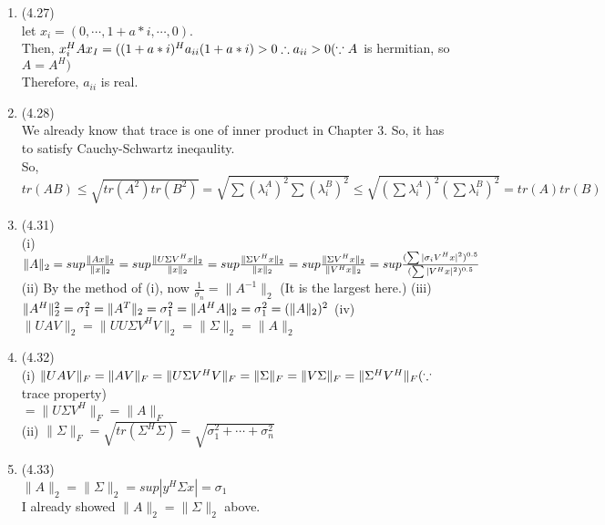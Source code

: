 \documentclass[letterpaper,12pt]{article}
\theoremstyle{definition}
\begin{document}
\begin{enumerate}
	\item (4.27) \\
let $x_i=(0, \cdots, 1+a*i, \cdots, 0)$.\\
Then, $x_i^HAx_I=((1+a*i)^Ha_{ii}(1+a*i)>0\\
\therefore a_{ii}>0 \\
(\because A$ is hermitian, so $A=A^H)$\\
Therefore, $a_{ii}$ is real.



 	\item (4.28) \\
We already know that trace is one of inner product in Chapter 3. So, it has to satisfy Cauchy-Schwartz ineqaulity.\\
So, $ tr(AB) \leq \sqrt{tr(A^2)tr(B^2)} = \sqrt{\sum (\lambda_i^A)^2\sum (\lambda_i^B)^2} \leq \sqrt{(\sum \lambda_i^A)^2(\sum \lambda_i^B)^2} = tr(A)tr(B)
$



 	\item (4.31) \\
(i) $\|A\|_2 = sup\frac{\| Ax\|_2}{\| x\|_2} =sup\frac{\| U\Sigma V^Hx\|_2}{\| x\|_2} =sup\frac{\| \Sigma V^Hx\|_2}{\| x\|_2} =sup\frac{\| \Sigma V^Hx\|_2}{\| V^Hx\|_2} = sup\frac{(\sum|\sigma_i V^Hx|^2 )^{0.5}}{(\sum|V^Hx|^2 )^{0.5}} \\$
(ii) By the method of (i), now $\frac{1}{\sigma_n}=\|A^{-1}\|_2 $ (It is the largest here.)$
$
(iii) $\| A^H\|_2^2=\sigma_1^2=\| A^T\|_2 = \sigma_1^2 = \| A^HA\|_2 = \sigma_1^2 = (\| A\|_2)^2\\$
(iv) $\| UAV\|_2 = \| UU\Sigma V^HV\|_2 = \| \Sigma\|_2 = \| A\|_2$





 	\item (4.32) \\
(i) $\| UAV\|_F =  \| AV\|_F = \| U\Sigma V^HV\|_F = \| \Sigma \|_F = \| V \Sigma \|_F = \| \Sigma^H V^H \|_F \\(\because $ trace property)\\
$= \| U \Sigma V^H\|_F = \| A \|_F
$\\
(ii) $\| \Sigma \|_F = \sqrt{tr(\Sigma^H\Sigma)} = \sqrt{\sigma_1^2 + \cdots + \sigma_n^2}$



 	\item (4.33) \\
$\| A \|_2 = \| \Sigma \|_2 = sup|y^H\Sigma x| = \sigma_1
$\\ I already showed $\| A \|_2 = \| \Sigma \|_2 $  above.



\end{enumerate}
\end{document}
